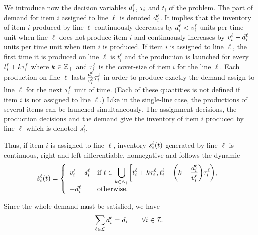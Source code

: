 We introduce now the decision variables $d_i^{\ell}$, $\tau_i$ and $t_i$ of the problem.
The part of demand for item $i$ assigned to line $\ell$ is denoted $d_i^{\ell}$.
It implies that the inventory of item $i$ produced by line $\ell$  continuously decreases by $d_i^{\ell}<v_i^{\ell}$ units per time unit when line $\ell$ does not produce item $i$ and continuously increases by $v_i^{\ell}-d_i^{\ell}$ units per time unit when item $i$ is produced.
If item $i$ is assigned to line $\ell$, the first time it is produced on line $\ell$ is $t_i^{\ell}$ and the production is launched for every $t_i^{\ell}+k\tau_i^{\ell}$ where $k\in\mathbb{Z}_+$ and $\tau_i^{\ell}$ is the cover-size of item $i$ for the line $\ell$.
Each production on line $\ell$ lasts $\frac{d_i^{\ell}}{v_i^{\ell}}\tau_i^{\ell}$ in order to produce exactly the demand assign to line $\ell$ for the next $\tau_i^{\ell}$ unit of time.
(Each of these quantities is not defined if item $i$ is not assigned to line $\ell$.)
Like in the single-line case, the productions of several items can be launched simultaneously.
The assignment decisions, the production decisions and the demand give the inventory of item $i$ produced by line $\ell$ which is denoted $s_i^{\ell}$.



Thus, if item $i$ is assigned to line $\ell$, inventory $\inventory_i^{\ell}\bracket{t}$ generated by line $\ell$ is continuous, right and left differentiable, nonnegative and follows the dynamic
\begin{equation}\label{eq:lot-size:multi-line:motivations:dynamic}
  \dot{\inventory}_i^{\ell}\bracket{t} =
  \left\{
  \begin{array}{ll}
  \rate_i^{\ell}-\demand_i^{\ell}
  & \ds\mbox{if}\ t\in\bigcup_{k\in\ZZ_+} \left[t_i^{\ell}+k\cover_i^{\ell},t_i^{\ell}+\bracket{k+\frac{\demand_i^{\ell}}{\rate_i^{\ell}}}\cover_i^{\ell}\right),
  \\
  -\demand_i^{\ell}
  & \mbox{otherwise}.
  \end{array}
  \right.
\end{equation}


Since the whole demand must be satisfied, we have
\begin{equation}\label{eq:lot-size:multi-line:motivations:whole-demand}
  \sum_{\ell\in\mathcal{L}}d_i^{\ell}=d_i\qquad\forall i\in\mathcal{I}.
\end{equation}


